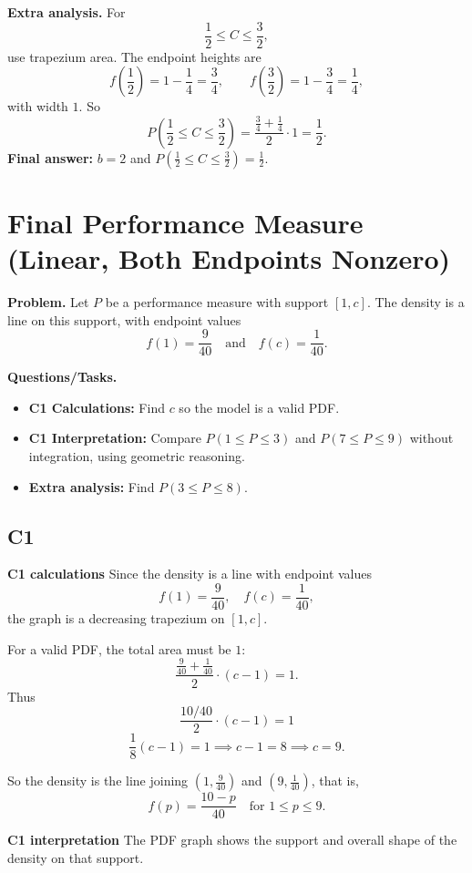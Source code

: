 	\textbf{Extra analysis.}
	For
	\[
	\frac12\le C\le\frac32,
	\]
	use trapezium area. The endpoint heights are
	\[
	f\!\left(\frac12\right)=1-\frac14=\frac34,
	\qquad
	f\!\left(\frac32\right)=1-\frac34=\frac14,
	\]
	with width $1$. So
	\[
	P\!\left(\frac12\le C\le\frac32\right)
	=
	\frac{\frac34+\frac14}{2}\cdot1
	=
	\frac12.
	\]
	\textbf{Final answer:} $b=2$ and $P\!\left(\frac12\le C\le\frac32\right)=\frac12$.
	\section{Final Performance Measure (Linear, Both Endpoints Nonzero)}
	
	\textbf{Problem.}
	Let $P$ be a performance measure with support $[1,c]$. The density is a line on this support, with endpoint values
	\[
	f(1)=\frac{9}{40}
	\quad\text{and}\quad
	f(c)=\frac{1}{40}.
	\]
	
	\textbf{Questions/Tasks.}
	\begin{itemize}
		\item \textbf{C1 Calculations:} Find $c$ so the model is a valid PDF.
		\item \textbf{C1 Interpretation:} Compare $P(1\le P\le 3)$ and $P(7\le P\le 9)$ without integration, using geometric reasoning.
		\item \textbf{Extra analysis:} Find $P(3\le P\le 8)$.
	\end{itemize}
	
	\subsection*{C1}
	
	\textbf{C1 calculations}
	Since the density is a line with endpoint values
	\[
	f(1)=\frac{9}{40},\quad f(c)=\frac{1}{40},
	\]
	the graph is a decreasing trapezium on $[1,c]$.
	
	For a valid PDF, the total area must be $1$:
	\[
	\frac{\frac{9}{40}+\frac{1}{40}}{2}\cdot(c-1)=1.
	\]
	Thus
	\[
	\frac{10/40}{2}\cdot(c-1)=1
	\]
	\[
	\frac18(c-1)=1\implies c-1=8\implies c=9.
	\]
	
	So the density is the line joining $(1,\frac{9}{40})$ and $(9,\frac{1}{40})$, that is,
	\[
	f(p)=\frac{10-p}{40}\quad\text{for }1\le p\le 9.
	\]
	
	\textbf{C1 interpretation}
	The PDF graph shows the support and overall shape of the density on that support.
	
